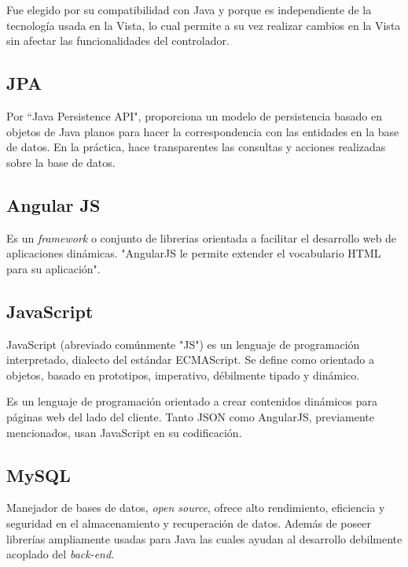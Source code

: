         Fue elegido por su compatibilidad con Java y porque es independiente de la tecnología usada en la Vista, lo cual permite a su vez realizar cambios en la Vista sin afectar las funcionalidades del controlador.
        
        \subsection{JPA}
        
        Por ``Java Persistence API", proporciona un modelo de persistencia basado en objetos de Java planos para hacer la correspondencia con las entidades en la base de datos\cite{JPA-definicion}. En la práctica, hace transparentes las consultas y acciones realizadas sobre la base de datos.
        
        \subsection{Angular JS}
        
        Es un \textit{framework} o conjunto de librerias orientada a facilitar el desarrollo web de aplicaciones dinámicas. "AngularJS le permite extender el vocabulario HTML para su aplicación"\cite{ANGULARJS-angularjs}.
        
        \subsection{JavaScript}
        
        JavaScript (abreviado comúnmente "JS") es un lenguaje de programación interpretado, dialecto del estándar ECMAScript. Se define como orientado a objetos, basado en prototipos, imperativo, débilmente tipado y dinámico\cite{JAVASCRIPT-wiki}.
        
        Es un lenguaje de programación orientado a crear contenidos dinámicos para páginas web del lado del cliente. Tanto JSON como AngularJS, previamente mencionados, usan JavaScript en su codificación.
        
        \subsection{MySQL}
        
        Manejador de bases de datos, \textit{open source}, ofrece alto rendimiento, eficiencia y seguridad en el almacenamiento y recuperación de datos\cite{MYSQL-oracle}. Además de poseer librerías ampliamente usadas para Java las cuales ayudan al desarrollo debilmente acoplado del \textit{back-end}.
        
